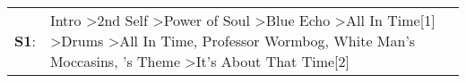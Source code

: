 \begin{supertabular}{p{0.03\textwidth}p{0.92\textwidth}}
 \textbf{S1}:  &  Intro\textsuperscript{} \textgreater \enspace 2nd Self\textsuperscript{} \textgreater \enspace Power of Soul\textsuperscript{} \textgreater \enspace Blue Echo\textsuperscript{} \textgreater \enspace All In Time[1]\textsuperscript{} \textgreater \enspace Drums\textsuperscript{} \textgreater \enspace All In Time\textsuperscript{}, \enspace Professor Wormbog\textsuperscript{}, \enspace White Man's Moccasins\textsuperscript{}, 's Theme\textsuperscript{} \textgreater \enspace It's About That Time[2]\textsuperscript{}  \enspace  \\
\end{supertabular}

